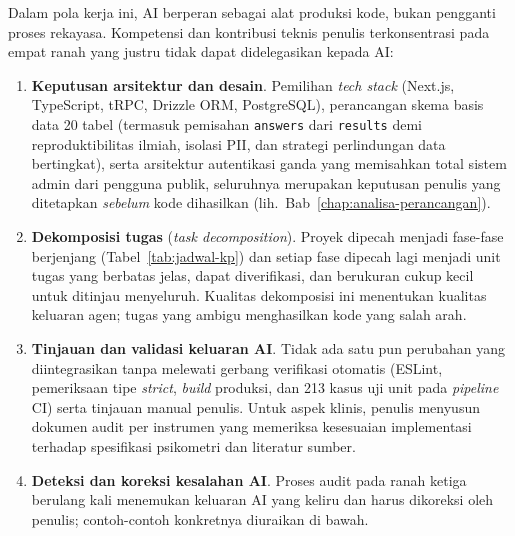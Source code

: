 Dalam pola kerja ini, AI berperan sebagai alat produksi kode, bukan pengganti proses rekayasa. Kompetensi dan kontribusi teknis penulis terkonsentrasi pada empat ranah yang justru tidak dapat didelegasikan kepada AI:

\begin{enumerate}[leftmargin=2cm]
  \item \textbf{Keputusan arsitektur dan desain}. Pemilihan \textit{tech stack} (Next.js, TypeScript, tRPC, Drizzle ORM, PostgreSQL), perancangan skema basis data 20 tabel (termasuk pemisahan \texttt{answers} dari \texttt{results} demi reproduktibilitas ilmiah, isolasi PII, dan strategi perlindungan data bertingkat), serta arsitektur autentikasi ganda yang memisahkan total sistem admin dari pengguna publik, seluruhnya merupakan keputusan penulis yang ditetapkan \textit{sebelum} kode dihasilkan (lih.\ Bab~\ref{chap:analisa-perancangan}).
  \item \textbf{Dekomposisi tugas} (\textit{task decomposition}). Proyek dipecah menjadi fase-fase berjenjang (Tabel~\ref{tab:jadwal-kp}) dan setiap fase dipecah lagi menjadi unit tugas yang berbatas jelas, dapat diverifikasi, dan berukuran cukup kecil untuk ditinjau menyeluruh. Kualitas dekomposisi ini menentukan kualitas keluaran agen; tugas yang ambigu menghasilkan kode yang salah arah.
  \item \textbf{Tinjauan dan validasi keluaran AI}. Tidak ada satu pun perubahan yang diintegrasikan tanpa melewati gerbang verifikasi otomatis (ESLint, pemeriksaan tipe \textit{strict}, \textit{build} produksi, dan 213 kasus uji unit pada \textit{pipeline} CI) serta tinjauan manual penulis. Untuk aspek klinis, penulis menyusun dokumen audit per instrumen yang memeriksa kesesuaian implementasi terhadap spesifikasi psikometri dan literatur sumber.
  \item \textbf{Deteksi dan koreksi kesalahan AI}. Proses audit pada ranah ketiga berulang kali menemukan keluaran AI yang keliru dan harus dikoreksi oleh penulis; contoh-contoh konkretnya diuraikan di bawah.
\end{enumerate}


